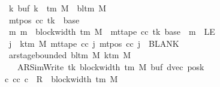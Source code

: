 \begin{isabellebody}
\ \ \ \ \ \ \ \ \ \ \ \ \ \ \ \ \ {\isasymforall}k{\isachardot}{\kern0pt}\ buf\ k\ {\isasymin}\ {\isasymGamma}{\isacharunderscore}{\kern0pt}tm\ M\ {\isasymunion}\ {\isacharbraceleft}{\kern0pt}bl{\isacharunderscore}{\kern0pt}tm\ M{\isacharbraceright}{\kern0pt}{\isacharsemicolon}{\kern0pt}\isanewline
\ \ \ \ \ \ \ \ \ \ \ \ \ \ \ \ \ mt{\isacharunderscore}{\kern0pt}pos\ cc\ tk\ {\isacharequal}{\kern0pt}\ base{\isacharsemicolon}{\kern0pt}\isanewline
\ \ \ \ \ \ \ \ \ \ \ \ \ \ \ \ \ {\isasymAnd}m{\isachardot}{\kern0pt}\ m\ {\isacharless}{\kern0pt}\ block{\isacharunderscore}{\kern0pt}width\ {\isacharparenleft}{\kern0pt}{\isasymGamma}{\isacharunderscore}{\kern0pt}tm\ M{\isacharparenright}{\kern0pt}\ {\isasymLongrightarrow}\ mt{\isacharunderscore}{\kern0pt}tape\ cc\ tk\ {\isacharparenleft}{\kern0pt}base\ {\isacharplus}{\kern0pt}\ m{\isacharparenright}{\kern0pt}\ {\isasymnoteq}\ LE{}{\isacharsemicolon}{\kern0pt}\isanewline
\ \ \ \ \ \ \ \ \ \ \ \ \ \ \ \ \ {\isasymforall}j\ {\isasymge}\ k{\isacharunderscore}{\kern0pt}tm\ M{\isachardot}{\kern0pt}\ mt{\isacharunderscore}{\kern0pt}tape\ cc\ j\ {\isacharparenleft}{\kern0pt}mt{\isacharunderscore}{\kern0pt}pos\ cc\ j{\isacharparenright}{\kern0pt}\ {\isacharequal}{\kern0pt}\ BLANK{}{\isacharsemicolon}{\kern0pt}\isanewline
\ \ \ \ \ \ \ \ \ \ \ \ \ \ \ \ \ ar{\isacharunderscore}{\kern0pt}stage{\isacharunderscore}{\kern0pt}bounded\ {\isacharparenleft}{\kern0pt}bl{\isacharunderscore}{\kern0pt}tm\ M{\isacharparenright}{\kern0pt}\ {\isacharparenleft}{\kern0pt}k{\isacharunderscore}{\kern0pt}tm\ M{\isacharparenright}{\kern0pt}\isanewline
\ \ \ \ \ \ \ \ \ \ \ \ \ \ \ \ \ \ \ {\isacharparenleft}{\kern0pt}AR{\isacharunderscore}{\kern0pt}SimWrite{\isacharcomma}{\kern0pt}\ tk{\isacharcomma}{\kern0pt}\ block{\isacharunderscore}{\kern0pt}width\ {\isacharparenleft}{\kern0pt}{\isasymGamma}{\isacharunderscore}{\kern0pt}tm\ M{\isacharparenright}{\kern0pt}{\isacharcomma}{\kern0pt}\ buf{\isacharcomma}{\kern0pt}\ dvec{\isacharcomma}{\kern0pt}\ posk{\isacharparenright}{\kern0pt}\ {\isasymrbrakk}\isanewline
\ \ \ \ \ \ \ \ \ \ \ \ \ \ \ {\isasymLongrightarrow}\ {\isasymexists}c{}{\isachardot}{\kern0pt}\ {\isacharparenleft}{\kern0pt}cc{\isacharcomma}{\kern0pt}\ c{}{\isacharparenright}{\kern0pt}\ {\isasymin}\ R{\isacharprime}{\kern0pt}\ {\isacharcircum}{\kern0pt}{\isacharcircum}{\kern0pt}\ {\isacharparenleft}{\kern0pt}block{\isacharunderscore}{\kern0pt}width\ {\isacharparenleft}{\kern0pt}{\isasymGamma}{\isacharunderscore}{\kern0pt}tm\ M{\isacharparenright}{\kern0pt}\ {\isacharminus}{\kern0pt}\ {}{\isacharparenright}{\kern0pt}\isanewline

\end{isabellebody}
